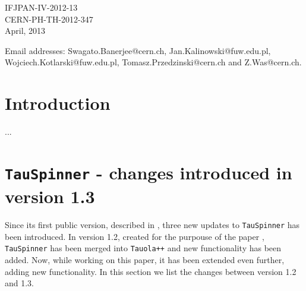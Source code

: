 \documentclass[12pt]{article}
\begin{document}
\begin{titlepage}
 \vspace{1cm}
\begin{flushleft}
{   IFJPAN-IV-2012-13 \\  CERN-PH-TH-2012-347\\
 April, 2013}
\end{flushleft}
 
\vspace*{1mm}
\bigskip
\footnoterule
\noindent
{\footnotesize \noindent%
Email addresses: Swagato.Banerjee@cern.ch, Jan.Kalinowski@fuw.edu.pl, Wojciech.Kotlarski@fuw.edu.pl, Tomasz.Przedzinski@cern.ch and Z.Was@cern.ch.
}
\end{titlepage}

\section {Introduction}

...





\appendix
\section{ {\tt TauSpinner} - changes introduced in version 1.3}
\label{sec:TauSpinnerChanges}
Since its first public version, described in \cite{Czyczula:2012ny}, three
new updates to {\tt TauSpinner} has been introduced. In version 1.2, created
for the purpouse of the paper \cite{SPIN2_PAPER}, {\tt TauSpinner}
has been merged into {\tt Tauola++}\cite{Davidson:2010rw} and new
functionality has been added. Now, while working on this paper,
it has been extended even further, adding new functionality.
In this section we list the changes between version 1.2 and 1.3.
\end{document}
